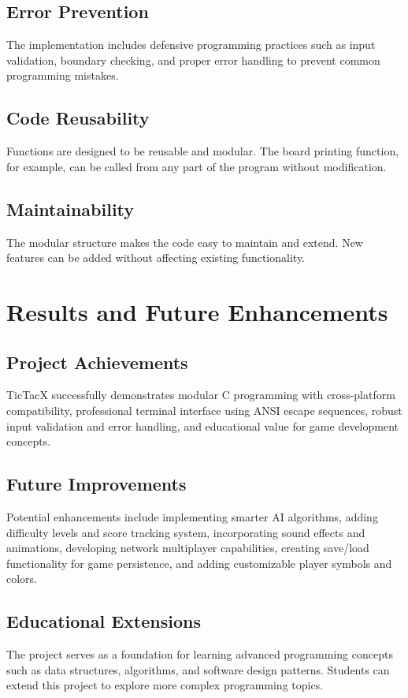 \documentclass[12pt]{article}
\begin{document}
\subsection{Error Prevention}
The implementation includes defensive programming practices such as input validation, boundary checking, and proper error handling to prevent common programming mistakes.

\subsection{Code Reusability}
Functions are designed to be reusable and modular. The board printing function, for example, can be called from any part of the program without modification.

\subsection{Maintainability}
The modular structure makes the code easy to maintain and extend. New features can be added without affecting existing functionality.

\section{Results and Future Enhancements}

\subsection{Project Achievements}
TicTacX successfully demonstrates modular C programming with cross-platform compatibility, professional terminal interface using ANSI escape sequences, robust input validation and error handling, and educational value for game development concepts.

\subsection{Future Improvements}
Potential enhancements include implementing smarter AI algorithms, adding difficulty levels and score tracking system, incorporating sound effects and animations, developing network multiplayer capabilities, creating save/load functionality for game persistence, and adding customizable player symbols and colors.

\subsection{Educational Extensions}
The project serves as a foundation for learning advanced programming concepts such as data structures, algorithms, and software design patterns. Students can extend this project to explore more complex programming topics.
\end{document}
